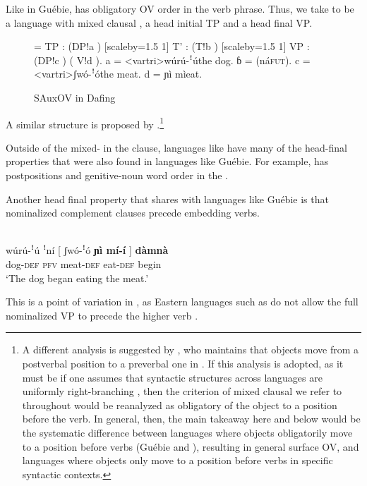 \documentclass[output=paper,newtxmath,modfonts,nonflat,draftmode]{langsci/langscibook}
\begin{document}
Like in Guébie,  has obligatory OV order in the verb phrase. Thus, we take  to be a language with mixed clausal , a head initial TP and a head final VP.

\begin{figure}
\jtree[xunit=2.5em,yunit=1.25em]
\! = {TP}
: ({DP}!a ) [scaleby=1.5 1] {T'}
: ({T}!b ) [scaleby=1.5 1] {VP}
: ({DP}!c ) ( {V}!d ).
\!a = <vartri>{{wúrú-ꜝú}}{the dog}.
ɓ = ({{ná}}{\textsc{fut}}).
\!c = <vartri>{{ʃwó-ꜝó}}{the meat}.
\!d = {{ɲì mì}}{eat}.
\endjtree	
\caption{SAuxOV in Dafing}\label{fig:sande:dafingtree}
\end{figure}
A similar structure is proposed by \citet{nikitina09}.\footnote{\label{koopfn}A different analysis is suggested by \citet{Koopman:1984,koopman92}, who maintains that objects move from a postverbal position to a preverbal one in . If this analysis is adopted, as it must be if one assumes that syntactic structures across languages are uniformly right-branching \citep{kayne94}, then the criterion of mixed clausal  we refer to throughout would be reanalyzed as obligatory  of the object to a position before the verb. In general, then, the main takeaway here and below would be the systematic difference between languages where objects obligatorily move to a position before verbs (Guébie and ), resulting in general surface OV, and languages where objects only move to a position before verbs in specific syntactic contexts.}

Outside of the mixed- in the clause,  languages like  have many of the head-final properties that were also found in  languages like Guébie. For example,  has postpositions  and genitive-noun word order in the  . 

Another head final property that  shares with  languages like Guébie  is that nominalized complement clauses precede embedding verbs.

\ea {}\\
\gll wúrú-ꜝú {ꜝ{ní}} [ {ʃwó-ꜝó} \textbf{{ɲì mí-í}} ] \textbf{{dàmnà}} \\
{dog}-\textsc{def} \textsc{pfv} {} meat-\textsc{def} eat-\textsc{def} {} begin\\
\glt `The dog began eating the meat.'
\z 

This is a point of variation in , as Eastern  languages such as  do not allow the full nominalized VP to precede the higher verb \citep{nikitina09}.
\end{document}
